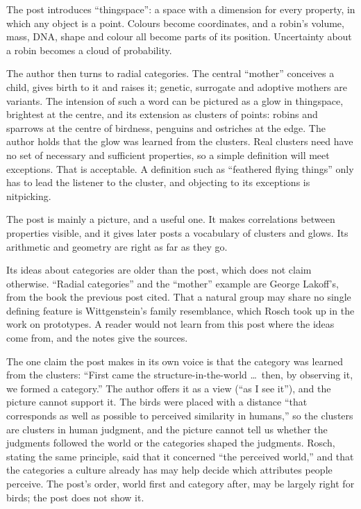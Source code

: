 \begin{afterword}
\summaryhead

The post introduces ``thingspace'': a space with a dimension for every property, in which any object is a point. Colours become coordinates, and a robin's volume, mass, DNA, shape and colour all become parts of its position. Uncertainty about a robin becomes a cloud of probability.

The author then turns to radial categories. The central ``mother'' conceives a child, gives birth to it and raises it; genetic, surrogate and adoptive mothers are variants. The intension of such a word can be pictured as a glow in thingspace, brightest at the centre, and its extension as clusters of points: robins and sparrows at the centre of birdness, penguins and ostriches at the edge. The author holds that the glow was learned from the clusters. Real clusters need have no set of necessary and sufficient properties, so a simple definition will meet exceptions. That is acceptable. A definition such as ``feathered flying things'' only has to lead the listener to the cluster, and objecting to its exceptions is nitpicking.

\responsehead

The post is mainly a picture, and a useful one. It makes correlations between properties visible, and it gives later posts a vocabulary of clusters and glows. Its arithmetic and geometry are right as far as they go.

Its ideas about categories are older than the post, which does not claim otherwise. ``Radial categories'' and the ``mother'' example are George Lakoff's, from the book the previous post cited. That a natural group may share no single defining feature is Wittgenstein's family resemblance, which Rosch took up in the work on prototypes. A reader would not learn from this post where the ideas come from, and the notes give the sources.

The one claim the post makes in its own voice is that the category was learned from the clusters: ``First came the structure-in-the-world \ldots\ then, by observing it, we formed a category.'' The author offers it as a view (``as I see it''), and the picture cannot support it. The birds were placed with a distance ``that corresponds as well as possible to perceived similarity in humans,'' so the clusters are clusters in human judgment, and the picture cannot tell us whether the judgments followed the world or the categories shaped the judgments. Rosch, stating the same principle, said that it concerned ``the perceived world,'' and that the categories a culture already has may help decide which attributes people perceive. The post's order, world first and category after, may be largely right for birds; the post does not show it.


\end{afterword}
